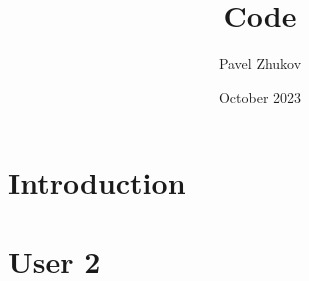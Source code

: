\documentclass{article}
\title{Code}
\author{Pavel Zhukov}
\date{October 2023}
\begin{document}
\maketitle

\section{Introduction}


\section{User 2}
\end{document}
